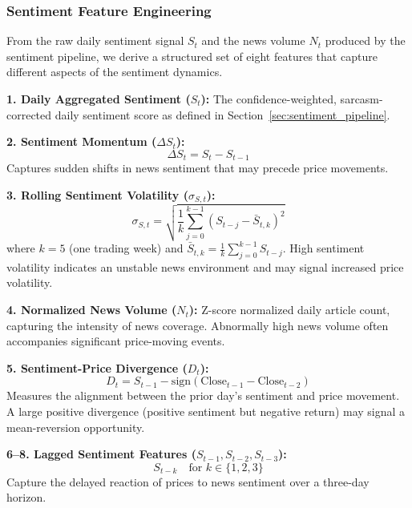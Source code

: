 \subsubsection{Sentiment Feature Engineering}
\label{sec:sentiment_features}

From the raw daily sentiment signal $S_t$ and the news volume $N_t$ produced by the sentiment pipeline, we derive a structured set of eight features that capture different aspects of the sentiment dynamics.

\textbf{1. Daily Aggregated Sentiment ($S_t$):}
The confidence-weighted, sarcasm-corrected daily sentiment score as defined in Section~\ref{sec:sentiment_pipeline}.

\textbf{2. Sentiment Momentum ($\Delta S_t$):}
\begin{equation}
\Delta S_t = S_t - S_{t-1}
\end{equation}
Captures sudden shifts in news sentiment that may precede price movements.

\textbf{3. Rolling Sentiment Volatility ($\sigma_{S,t}$):}
\begin{equation}
\sigma_{S,t} = \sqrt{\frac{1}{k} \sum_{j=0}^{k-1} \left(S_{t-j} - \bar{S}_{t,k}\right)^2}
\end{equation}
where $k = 5$ (one trading week) and $\bar{S}_{t,k} = \frac{1}{k}\sum_{j=0}^{k-1} S_{t-j}$. High sentiment volatility indicates an unstable news environment and may signal increased price volatility.

\textbf{4. Normalized News Volume ($N_t$):}
Z-score normalized daily article count, capturing the intensity of news coverage. Abnormally high news volume often accompanies significant price-moving events.

\textbf{5. Sentiment-Price Divergence ($D_t$):}
\begin{equation}
D_t = S_{t-1} - \text{sign}\left(\text{Close}_{t-1} - \text{Close}_{t-2}\right)
\end{equation}
Measures the alignment between the prior day's sentiment and price movement. A large positive divergence (positive sentiment but negative return) may signal a mean-reversion opportunity.

\textbf{6--8. Lagged Sentiment Features ($S_{t-1}, S_{t-2}, S_{t-3}$):}
\begin{equation}
S_{t-k} \quad \text{for } k \in \{1, 2, 3\}
\end{equation}
Capture the delayed reaction of prices to news sentiment over a three-day horizon.

